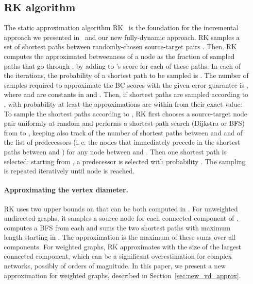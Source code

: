 \documentclass[english]{llncs}
\newcommand{\ie}{i.\,e.\xspace}
\newcommand{\vd}{\xspace}
\newcommand{\rk}{\textsf{RK}\xspace}
\begin{document}
\subsection{\rk algorithm}
\label{sec:rk}
The static approximation algorithm \rk~\cite{DBLP:conf/wsdm/RiondatoK14} is
the foundation for the incremental approach we presented in~\cite{DBLP:conf/alenex/BergaminiMS15} and our new fully-dynamic approach. \rk samples a set  of  shortest paths between randomly-chosen source-target pairs .
Then, \rk computes the approximated
betweenness  of a node  as the
fraction of sampled paths  that go through , by adding  to 's score for each of these paths.
In each of the  iterations, the probability of a shortest path  to be sampled is . The number  of samples required to approximate the BC scores with the given error guarantee is , where  and  are constants in  and .
Then, if  shortest paths
are sampled according to , with probability at least  the approximations
 are within 
from their exact value: 
To sample the shortest paths according to , \rk first chooses
a source-target node pair  uniformly at random and performs a shortest-path search (Dijkstra or BFS) from  to , keeping also track of the number 
of shortest paths between  and  and of the list of predecessors
 (\ie the nodes that immediately precede  in the shortest paths between  and ) for any node  between  and . Then one shortest path is selected: 
starting from , a predecessor 
is selected with probability .
The sampling is repeated iteratively
until node  is reached.
\paragraph{Approximating the vertex diameter.}
\rk uses two upper bounds on \vd that can be both computed in . For unweighted undirected graphs, it samples a source node  for each connected component of , computes a BFS from each  and sums the two shortest paths with maximum length starting in . The \vd approximation is the maximum of these sums over all components. For weighted graphs, \rk approximates \vd with the size of the largest connected component, which can be a significant overestimation for complex networks, possibly of orders of magnitude. In this paper, we present a new approximation for weighted graphs, described in Section~\ref{sec:new_vd_approx}.
\end{document}
